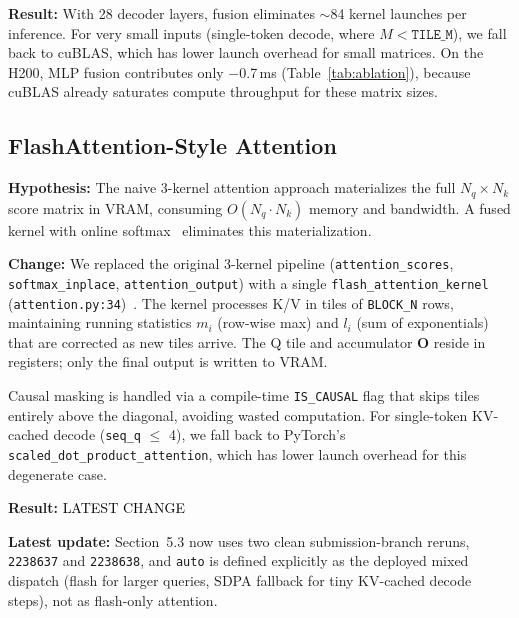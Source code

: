 \documentclass{article}
\newcommand{\latestchglabel}{{\setlength{\fboxsep}{1pt}\colorbox{yellow!65}{\textcolor{black}{\scriptsize LATEST CHANGE}}}}
\newcommand{\latestchgblock}[1]{%
  \begingroup
  \setlength{\fboxsep}{4pt}%
  \colorbox{yellow!20}{%
    \parbox{\dimexpr\linewidth-2\fboxsep\relax}{#1}%
  }%
  \endgroup
}
\begin{document}
\textbf{Result:} With 28 decoder layers, fusion eliminates $\sim$84 kernel launches per inference.  For very small inputs (single-token decode, where $M < \texttt{TILE\_M}$), we fall back to cuBLAS, which has lower launch overhead for small matrices.
On the H200, MLP fusion contributes only $-$0.7\,ms (Table~\ref{tab:ablation}), because cuBLAS already saturates compute throughput for these matrix sizes.

\subsection{FlashAttention-Style Attention}

\textbf{Hypothesis:} The naive 3-kernel attention approach materializes the full $N_q \times N_k$ score matrix in VRAM, consuming $O(N_q \cdot N_k)$ memory and bandwidth.  A fused kernel with online softmax~\citep{milakov2018online} eliminates this materialization.

\textbf{Change:} We replaced the original 3-kernel pipeline (\texttt{attention\_scores}, \texttt{softmax\_inplace}, \texttt{attention\_output}) with a single \texttt{flash\_attention\_kernel} (\texttt{attention.py:34})~\citep{dao2023flashattention2fasterattentionbetter, ringlein2025anatomy}.  The kernel processes K/V in tiles of \texttt{BLOCK\_N} rows, maintaining running statistics $m_i$ (row-wise max) and $l_i$ (sum of exponentials) that are corrected as new tiles arrive.  The Q tile and accumulator $\mathbf{O}$ reside in registers; only the final output is written to VRAM.

Causal masking is handled via a compile-time \texttt{IS\_CAUSAL} flag that skips tiles entirely above the diagonal, avoiding wasted computation.  For single-token KV-cached decode (\texttt{seq\_q} $\leq$ 4), we fall back to PyTorch's \texttt{scaled\_dot\_product\_attention}, which has lower launch overhead for this degenerate case.

\textbf{Result:} \latestchglabel

\latestchgblock{\textbf{Latest update:} Section~5.3 now uses two clean submission-branch reruns, \texttt{2238637} and \texttt{2238638}, and \texttt{auto} is defined explicitly as the deployed mixed dispatch (flash for larger queries, SDPA fallback for tiny KV-cached decode steps), not as flash-only attention.}
\end{document}
